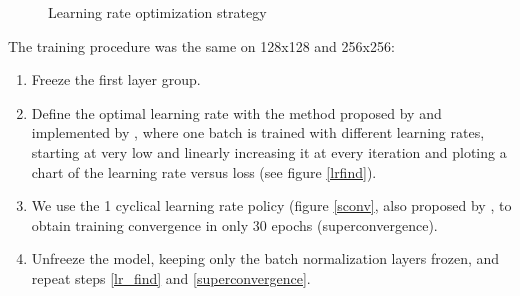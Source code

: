 \documentclass[conference]{IEEEtran}
\begin{document}
\begin{figure}
\centering
{}
\hfil
{}
\caption{Learning rate optimization strategy}\label{lr_find_chart}
\end{figure}

The training procedure was the same on 128x128 and 256x256:
\begin{enumerate}
  \item Freeze the first layer group.
  \item \label{lr_find}Define the optimal learning rate with the method proposed by \cite{leslie} and implemented by \cite{fastai}, where one batch is trained with different learning rates, starting at very low and linearly increasing it at every iteration and ploting a chart of the learning rate versus loss (see figure \ref{lrfind}).
  \item \label{superconvergence}We use the 1 cyclical learning rate policy (figure \ref{sconv}, also proposed by \cite{leslie}, to obtain training convergence in only 30 epochs (superconvergence).
  \item Unfreeze the model, keeping only the batch normalization layers frozen, and repeat steps \ref{lr_find} and \ref{superconvergence}.
\end{enumerate}
\end{document}
